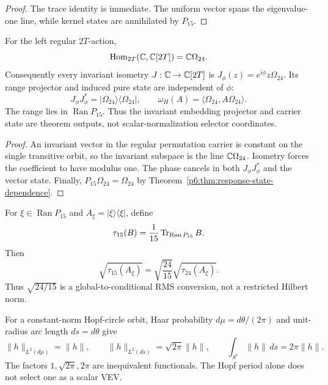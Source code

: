 \documentclass[11pt,a4paper]{article}
\newcommand{\Ran}{\operatorname{Ran}}
\begin{document}
\begin{proof}
The trace identity is immediate.  The uniform vector spans the eigenvalue-one
line, while kernel states are annihilated by \(P_{15}\).
\end{proof}

\begin{theorem}
\label{p6:thm:canonical-invariant-scalar-state}
For the left regular \(2T\)-action,
\[
\operatorname{Hom}_{2T}(\mathbb{C},\mathbb{C}[2T])
=\mathbb{C}\Omega_{24}.
\]
Consequently every invariant isometry
\(J:\mathbb{C}\to\mathbb{C}[2T]\) is
\(J_\phi(z)=e^{i\phi}z\Omega_{24}\).  Its range projector and induced pure
state are independent of \(\phi\):
\[
J_\phi J_\phi^*=|\Omega_{24}\rangle\langle\Omega_{24}|,
\qquad
\omega_H(A)=\langle\Omega_{24},A\Omega_{24}\rangle.
\]
The range lies in \(\operatorname{Ran}P_{15}\).  Thus the invariant embedding
projector and carrier state are theorem outputs, not scalar-normalization
selector coordinates.
\end{theorem}

\begin{proof}
An invariant vector in the regular permutation carrier is constant on the
single transitive orbit, so the invariant subspace is the line
\(\mathbb{C}\Omega_{24}\).  Isometry forces the coefficient to have modulus one.
The phase cancels in both \(J_\phi J_\phi^*\) and the vector state.  Finally,
\(P_{15}\Omega_{24}=\Omega_{24}\) by
Theorem~\ref{p6:thm:response-state-dependence}.
\end{proof}

\begin{corollary}
\label{p6:cor:conditional-trace-conversion}
For \(\xi\in\Ran P_{15}\) and \(A_\xi=|\xi\rangle\langle\xi|\), define
\[
\tau_{15}(B)=\frac1{15}\Tr_{\Ran P_{15}}B.
\]
Then
\[
\sqrt{\tau_{15}(A_\xi)}
=
\sqrt{\frac{24}{15}}\sqrt{\tau_{24}(A_\xi)}.
\]
Thus \(\sqrt{24/15}\) is a global-to-conditional RMS conversion, not a
restricted Hilbert norm.
\end{corollary}

\begin{theorem}
\label{p6:thm:circle-normalization}
For a constant-norm Hopf-circle orbit, Haar probability \(d\mu=d\theta/(2\pi)\)
and unit-radius arc length \(ds=d\theta\) give
\[
\|h\|_{L^2(d\mu)}=\|h\|,
\qquad
\|h\|_{L^2(ds)}=\sqrt{2\pi}\|h\|,
\qquad
\int_{S^1}\|h\|\,ds=2\pi\|h\|.
\]
The factors \(1,\sqrt{2\pi},2\pi\) are inequivalent functionals.  The Hopf
period alone does not select one as a scalar VEV.
\end{theorem}
\end{document}

